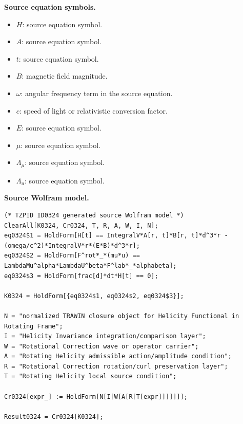 \begin{minipage}[t]{0.49\linewidth}
\begingroup
\small
\raggedright
\textbf{Source equation symbols.}\par
\begin{itemize}[leftmargin=1.35em,itemsep=1pt,topsep=1pt,parsep=0pt]
    \item $H$: source equation symbol.
    \item $A$: source equation symbol.
    \item $t$: source equation symbol.
    \item $B$: magnetic field magnitude.
    \item $\omega$: angular frequency term in the source equation.
    \item $c$: speed of light or relativistic conversion factor.
    \item $E$: source equation symbol.
    \item $\mu$: source equation symbol.
    \item $\Lambda_{\mu}$: source equation symbol.
    \item $\Lambda_{u}$: source equation symbol.
\end{itemize}
\endgroup
\end{minipage}\hfill
\begin{minipage}[t]{0.47\linewidth}
\begingroup
\scriptsize
\raggedright
\textbf{Source Wolfram model.}\par
\begin{Verbatim}[fontsize=\tiny,breaklines=true,breakanywhere=true]
(* TZPID ID0324 generated source Wolfram model *)
ClearAll[K0324, Cr0324, T, R, A, W, I, N];
eq0324$1 = HoldForm[H[t] == IntegralV*A[r, t]*B[r, t]*d^3*r - (omega/c^2)*IntegralV*r*(E*B)*d^3*r];
eq0324$2 = HoldForm[F^rot*_*(mu*u) == LambdaMu^alpha*LambdaU^beta*F^lab*_*alphabeta];
eq0324$3 = HoldForm[frac[d]*dt*H[t] == 0];

K0324 = HoldForm[{eq0324$1, eq0324$2, eq0324$3}];

N = "normalized TRAWIN closure object for Helicity Functional in Rotating Frame";
I = "Helicity Invariance integration/comparison layer";
W = "Rotational Correction wave or operator carrier";
A = "Rotating Helicity admissible action/amplitude condition";
R = "Rotational Correction rotation/curl preservation layer";
T = "Rotating Helicity local source condition";

Cr0324[expr_] := HoldForm[N[I[W[A[R[T[expr]]]]]]];

Result0324 = Cr0324[K0324];
\end{Verbatim}
\endgroup
\end{minipage}

